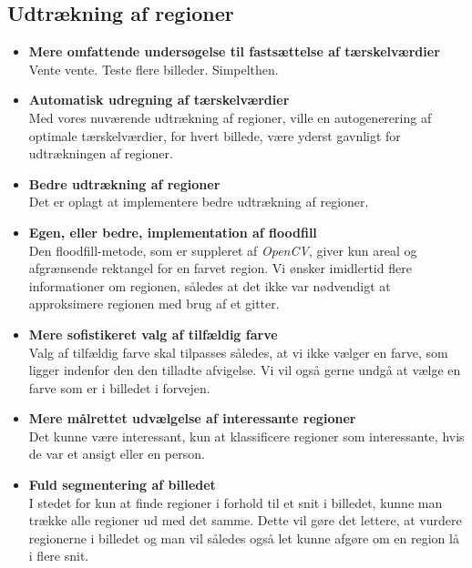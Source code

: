 {\subsection{Udtrækning af regioner}
\begin{itemize}
    \item \textbf{Mere omfattende undersøgelse til fastsættelse af tærskelværdier}\\
        Vente vente. Teste flere billeder. Simpelthen.
    \item \textbf{Automatisk udregning af tærskelværdier}\\
        Med vores nuværende udtrækning af regioner, ville en
        autogenerering af optimale tærskelværdier, for hvert billede,
        være yderst gavnligt for udtrækningen af regioner.
    \item \textbf{Bedre udtrækning af regioner}\\
        Det er oplagt at implementere bedre udtrækning af regioner.
    \item \textbf{Egen, eller bedre, implementation af floodfill}\\
        Den floodfill-metode, som er suppleret af \emph{OpenCV}, giver
        kun areal og afgrænsende rektangel for en farvet region. Vi
        ønsker imidlertid flere informationer om regionen, således at
        det ikke var nødvendigt at approksimere regionen med brug af et
        gitter.
    \item \textbf{Mere sofistikeret valg af tilfældig farve}\\
        Valg af tilfældig farve skal tilpasses således, at vi ikke
        vælger en farve, som ligger indenfor den den tilladte afvigelse.
        Vi vil også gerne undgå at vælge en farve som er i billedet i
        forvejen.
    \item \textbf{Mere målrettet udvælgelse af interessante regioner}\\
        Det kunne være interessant, kun at klassificere regioner som
        interessante, hvis de var et ansigt eller en person.
    \item \textbf{Fuld segmentering af billedet}\\
        I stedet for kun at finde regioner i forhold til et snit i
        billedet, kunne man trække alle regioner ud med det samme. Dette
        vil gøre det lettere, at vurdere regionerne i billedet og man
        vil således også let kunne afgøre om en region lå i flere snit.
\end{itemize}

}
